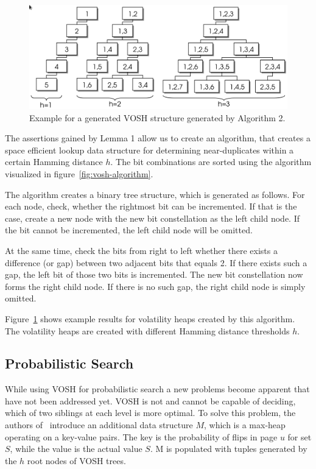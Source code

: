 \documentclass[12pt,a4paper,DIV=calc]{scrartcl}
\begin{document}
\begin{figure}[H]
    \includegraphics[scale=0.4]{./gfx/vosh_structure.png}
    \centering
    \caption{Example for a generated VOSH structure generated by Algorithm 2.}\label{fig:vosh-structure}
\end{figure}


The assertions gained by Lemma 1 allow us to create an algorithm, that creates a space efficient lookup data structure for determining near-duplicates within a certain Hamming distance $h$.
The bit combinations are sorted using the algorithm visualized in figure~\ref{fig:vosh-algorithm}.

The algorithm creates a binary tree structure, which is generated as follows.
For each node, check, whether the rightmost bit can be incremented.
If that is the case, create a new node with the new bit constellation as the left child node.
If the bit cannot be incremented, the left child node will be omitted.

At the same time, check the bits from right to left whether there exists a difference (or gap) between two adjacent bits that equals 2.
If there exists such a gap, the left bit of those two bits is incremented.
The new bit constellation now forms the right child node.
If there is no such gap, the right child node is simply omitted.

Figure~\ref{fig:vosh-structure} shows example results for volatility heaps created by this algorithm.
The volatility heaps are created with different Hamming distance thresholds $h$.

\subsection{Probabilistic Search}

While using VOSH for probabilistic search a new problems become apparent that have not been addressed yet.
VOSH is not and cannot be capable of deciding, which of two siblings at each level is more optimal.
To solve this problem, the authors of~\cite{inproc:main} introduce an additional data structure $M$, which is a max-heap operating on a key-value pairs.
The key is the probability of flips in page $u$ for set $S$, while the value is the actual value $S$.
M is populated with tuples generated by the $h$ root nodes of VOSH trees.
\end{document}

